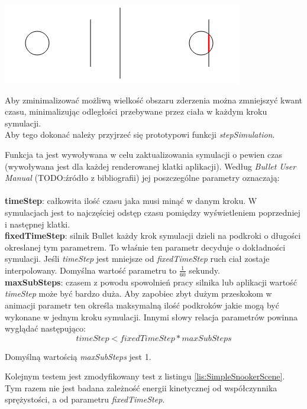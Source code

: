 \begin{center}
\includegraphics{./img/zderzenie2.png}
\end{center}

Aby zminimalizować możliwą wielkość obszaru zderzenia można zmniejszyć kwant
czasu, minimalizując odległości przebywane przez ciała w każdym kroku
symulacji.\\
Aby tego dokonać należy przyjrzeć się prototypowi funkcji \emph{stepSimulation}.



Funkcja ta jest wywoływana w celu zaktualizowania symulacji o pewien
czas (wywoływana jest dla każdej renderowanej klatki aplikacji). Według
\emph{Bullet User Manual} (TODO:źródło z bibliografii) jej poszczególne
parametry oznaczają:\\
\\
\textbf{timeStep}: całkowita ilość czasu jaka musi minąć w danym kroku. W
symulacjach jest to najczęściej odstęp czasu pomiędzy wyświetleniem poprzedniej
i następnej klatki.\\
\textbf{fixedTimeStep}: silnik Bullet każdy krok symulacji dzieli na podkroki o
długości okreslanej tym parametrem. To właśnie ten parametr decyduje o
dokładności symulacji. Jeśli \emph{timeStep} jest mniejsze od
\emph{fixedTimeStep} ruch ciał zostaje interpolowany. Domyślna wartość parametru
to $ \frac{1}{60} $ sekundy.\\
\textbf{maxSubSteps}: czasem z powodu spowolnień pracy silnika lub aplikacji
wartość \emph{timeStep} może być bardzo duża. Aby zapobiec zbyt dużym przeskokom
w animacji parametr ten określa maksymalną ilość podkroków jakie mogą być
wykonane w jednym kroku symulacji. Innymi słowy relacja parametrów powinna
wyglądać następująco:\\
\begin{equation}
timeStep < fixedTimeStep * maxSubSteps
\end{equation}

Domyślną wartością \emph{maxSubSteps} jest 1.

Kolejnym testem jest zmodyfikowany test z listingu \ref{lis:SimpleSnookerScene}.
Tym razem nie jest badana zależność energii kinetycznej od współczynnika
sprężystości, a od parametru \emph{fixedTimeStep}. 

